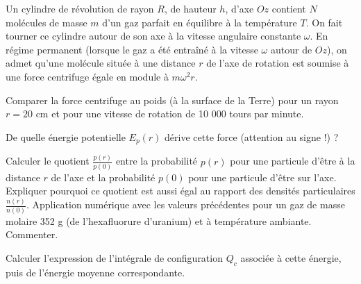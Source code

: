 Un cylindre de révolution de rayon $R$, de hauteur $h$, d'axe $Oz$ contient $N$ molécules de masse $m$ d'un
gaz parfait en équilibre à la température $T$. On fait tourner ce cylindre autour de son axe
à la vitesse angulaire constante $\omega$. En régime permanent (lorsque le gaz a  été entraîné à la vitesse $\omega$ autour de $Oz$),  on admet qu'une molécule située à une distance $r$ de l'axe de rotation est soumise à une force centrifuge égale en module à $m\omega^2 r$.

\question
Comparer la force centrifuge au poids (à la surface de la Terre)  pour un rayon $r=20$ cm et pour une vitesse de rotation de 10 000 tours par minute.

\question
De quelle énergie potentielle $E_p(r)$ dérive cette force (attention au signe !) ?

\question
Calculer le quotient $\frac{p(r)}{p(0)}$ entre la probabilité $p(r)$ pour une particule d'être à la distance $r$ de l'axe et la probabilité $p(0)$ pour une particule d'être sur l'axe. Expliquer pourquoi ce quotient est aussi égal au rapport des densités particulaires  $\frac{n(r)}{n(0)}$. Application numérique avec les valeurs précédentes pour un gaz de masse molaire 352 g (de l'hexafluorure d'uranium) et à température ambiante. Commenter.

\question
Calculer l'expression de l'intégrale de configuration $Q_c$ associée à cette énergie, puis de l'énergie moyenne correspondante.

